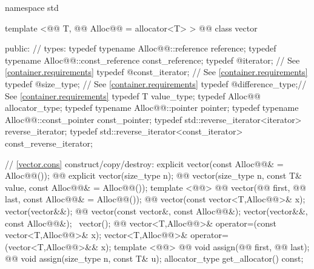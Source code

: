 \documentclass[american,twoside]{book}
\begin{document}
\begin{codeblock}
namespace std {
  template <@@ T, @@ Alloc@@ = allocator<T> >
  @@
  class vector {
  public:
    // types:
    typedef typename Alloc@@::reference         reference;
    typedef typename Alloc@@::const_reference   const_reference;
    typedef @\impdef@                iterator;       // See \ref{container.requirements}
    typedef @\impdef@                const_iterator; // See \ref{container.requirements}
    typedef @\impdef@                size_type;      // See \ref{container.requirements}
    typedef @\impdef@                difference_type;// See \ref{container.requirements}
    typedef T                                     value_type;
    typedef Alloc@@                             allocator_type;
    typedef typename Alloc@@::pointer           pointer;
    typedef typename Alloc@@::const_pointer     const_pointer;
    typedef std::reverse_iterator<iterator>       reverse_iterator;
    typedef std::reverse_iterator<const_iterator> const_reverse_iterator;

    // \ref{vector.cons} construct/copy/destroy:
    explicit vector(const Alloc@@& = Alloc@@());
    @@ 
      explicit vector(size_type n);
    @@ 
      vector(size_type n, const T& value, const Alloc@@& = Alloc@@());
    template <@@>
      @@
      vector(@@ first, @@ last,
             const Alloc@@& = Alloc@@());
    @@ vector(const vector<T,Alloc@@>& x);
    vector(vector&&);
    @@ vector(const vector&, const Alloc@@&);
    vector(vector&&, const Alloc@@&);
   ~vector();
    @@ 
      vector<T,Alloc@@>& operator=(const vector<T,Alloc@@>& x);
    vector<T,Alloc@@>& operator=(vector<T,Alloc@@>&& x);
    template <@@>
      @@
      void assign(@@ first, @@ last);
    @@ 
      void assign(size_type n, const T& u);
    allocator_type get_allocator() const;

}}
\end{codeblock}
\end{document}
